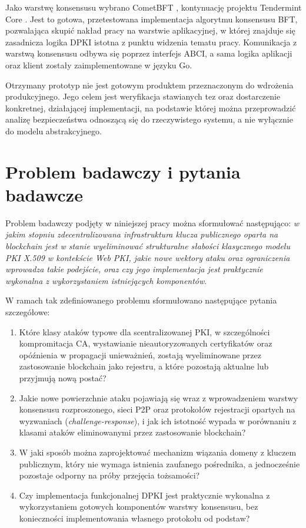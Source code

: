 Jako warstwę konsensusu wybrano CometBFT \cite{cometbft-docs}, kontynuację projektu Tendermint Core \cite{buchman2018tendermint}. Jest to gotowa, przetestowana implementacja algorytmu konsensusu BFT, pozwalająca skupić nakład pracy na warstwie aplikacyjnej, w której znajduje się zasadnicza logika DPKI istotna z punktu widzenia tematu pracy. Komunikacja z warstwą konsensusu odbywa się poprzez interfejs ABCI, a sama logika aplikacji oraz klient zostały zaimplementowane w języku Go.

Otrzymany prototyp nie jest gotowym produktem przeznaczonym do wdrożenia produkcyjnego. Jego celem jest weryfikacja stawianych tez oraz dostarczenie konkretnej, działającej implementacji, na podstawie której można przeprowadzić analizę bezpieczeństwa odnoszącą się do rzeczywistego systemu, a nie wyłącznie do modelu abstrakcyjnego.

\section{Problem badawczy i pytania badawcze}
\label{sec:problem-badawczy}

Problem badawczy podjęty w niniejszej pracy można sformułować następująco: \emph{w jakim stopniu zdecentralizowana infrastruktura klucza publicznego oparta na blockchain jest w stanie wyeliminować strukturalne słabości klasycznego modelu PKI X.509 w kontekście Web PKI, jakie nowe wektory ataku oraz ograniczenia wprowadza takie podejście, oraz czy jego implementacja jest praktycznie wykonalna z wykorzystaniem istniejących komponentów}.

W ramach tak zdefiniowanego problemu sformułowano następujące pytania szczegółowe:
\begin{enumerate}
    \item Które klasy ataków typowe dla scentralizowanej PKI, w szczególności kompromitacja CA, wystawianie nieautoryzowanych certyfikatów oraz opóźnienia w propagacji unieważnień, zostają wyeliminowane przez zastosowanie blockchain jako rejestru, a które pozostają aktualne lub przyjmują nową postać?
    \item Jakie nowe powierzchnie ataku pojawiają się wraz z wprowadzeniem warstwy konsensusu rozproszonego, sieci P2P oraz protokołów rejestracji opartych na wyzwaniach (\emph{challenge-response}), i jak ich istotność wypada w porównaniu z klasami ataków eliminowanymi przez zastosowanie blockchain?
    \item W jaki sposób można zaprojektować mechanizm wiązania domeny z kluczem publicznym, który nie wymaga istnienia zaufanego pośrednika, a jednocześnie pozostaje odporny na próby przejęcia tożsamości?
    \item Czy implementacja funkcjonalnej DPKI jest praktycznie wykonalna z wykorzystaniem gotowych komponentów warstwy konsensusu, bez konieczności implementowania własnego protokołu od podstaw?
\end{enumerate}


